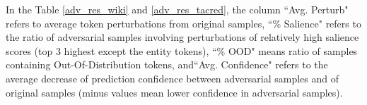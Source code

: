 \documentclass[sigconf]{acmart}
\begin{document}
\begin{table}[h]
   \centering 
{}
\caption{Extra statistics of TACRED adversarial samples.}
  \label{adv_res_tacred}
\end{table}

In the Table \ref{adv_res_wiki} and \ref{adv_res_tacred}, the column ``Avg. Perturb" refers to average token perturbations from original samples, ``\% Salience" refers to the ratio of adversarial samples involving perturbations of relatively high salience scores (top 3 highest except the entity tokens), ``\% OOD" means ratio of samples containing Out-Of-Distribution tokens, and``Avg. Confidence" refers to the average decrease of prediction confidence between adversarial samples and of original samples (minus values mean lower confidence in adversarial samples).



\end{document}
